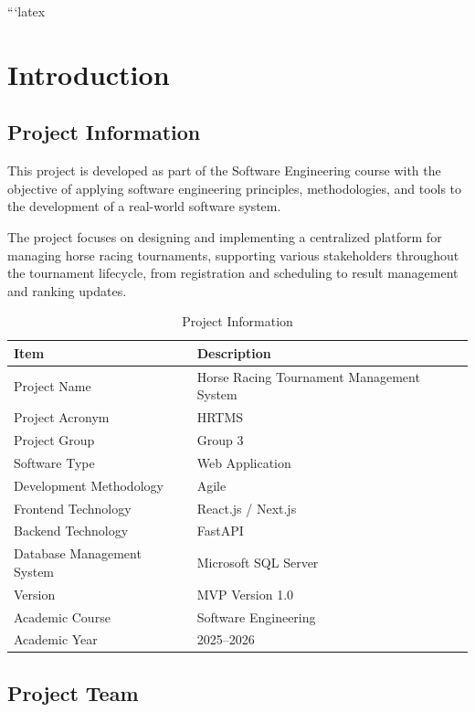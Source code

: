 ```latex
\chapter{Introduction}

\section{Project Information}

This project is developed as part of the Software Engineering course with the objective of applying software engineering principles, methodologies, and tools to the development of a real-world software system.

The project focuses on designing and implementing a centralized platform for managing horse racing tournaments, supporting various stakeholders throughout the tournament lifecycle, from registration and scheduling to result management and ranking updates.

\begin{table}[H]
	\centering
	\caption{Project Information}
	\begin{tabular}{|p{5cm}|p{8cm}|}
		\hline
		\textbf{Item} & \textbf{Description} \\
		\hline
		Project Name & Horse Racing Tournament Management System \\
		\hline
		Project Acronym & HRTMS \\
		\hline
		Project Group & Group 3 \\
		\hline
		Software Type & Web Application \\
		\hline
		Development Methodology & Agile \\
		\hline
		Frontend Technology & React.js / Next.js \\
		\hline
		Backend Technology & FastAPI \\
		\hline
		Database Management System & Microsoft SQL Server \\
		\hline
		Version & MVP Version 1.0 \\
		\hline
		Academic Course & Software Engineering \\
		\hline
		Academic Year & 2025--2026 \\
		\hline
	\end{tabular}
\end{table}

\section{Project Team}

